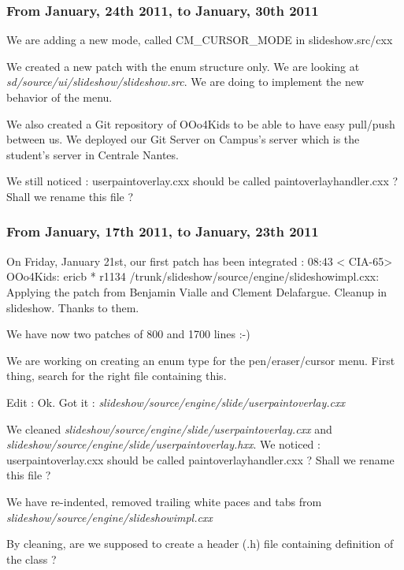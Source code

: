 \documentclass[a4paper,11pt]{article}
\begin{document}
\subsubsection*{From January, 24th 2011, to January, 30th 2011}

We are adding a new mode, called CM\_CURSOR\_MODE in slideshow.src/cxx

We created a new patch with the enum structure only. We are looking at \emph{sd/source/ui/slideshow/slideshow.src}. We are doing to implement the new behavior of the menu.

We also created a Git repository of OOo4Kids to be able to have easy pull/push between us. We deployed our Git Server on Campus's server which is the student's server in Centrale Nantes.

We still noticed : userpaintoverlay.cxx should be called paintoverlayhandler.cxx ? Shall we rename this file ?

\subsubsection*{From January, 17th 2011, to January, 23th 2011}

On Friday, January 21st, our first patch has been integrated : 08:43 < CIA-65> OOo4Kids: ericb * r1134 /trunk/slideshow/source/engine/slideshowimpl.cxx: Applying the patch from Benjamin Vialle and Clement Delafargue. Cleanup in slideshow. Thanks to them.

We have now two patches of 800 and 1700 lines :-)

We are working on creating an enum type for the pen/eraser/cursor menu. First thing, search for the right file containing this.

Edit : Ok. Got it : \emph{slideshow/source/engine/slide/userpaintoverlay.cxx}

We cleaned \emph{slideshow/source/engine/slide/userpaintoverlay.cxx} and \emph{slideshow/source/engine/slide/userpaintoverlay.hxx}.
We noticed : userpaintoverlay.cxx should be called paintoverlayhandler.cxx ? Shall we rename this file ?

We have re-indented, removed trailing white paces and tabs from \emph{slideshow/source/engine/slideshowimpl.cxx}

By cleaning, are we supposed to create a header (.h) file containing definition of the class ?
\end{document}
